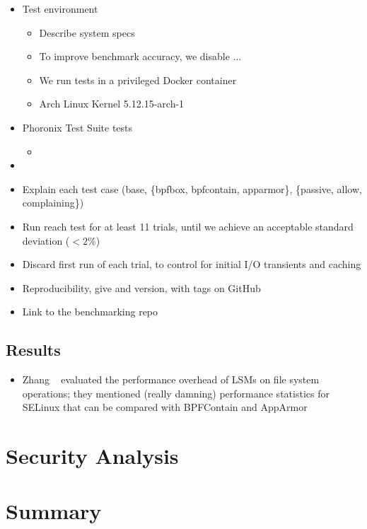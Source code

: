 \begin{inprogress}
  \begin{itemize}
    \item Test environment
    \begin{itemize}
      \item Describe system specs
      \item To improve benchmark accuracy, we disable ...
      \item We run tests in a privileged Docker container
      \item Arch Linux Kernel 5.12.15-arch-1
    \end{itemize}

    \item Phoronix Test Suite tests
    \begin{itemize}
      \item {}
    \end{itemize}

    \item {}

    \item Explain each test case (base, \{bpfbox, bpfcontain, apparmor\}, \{passive, allow, complaining\})
    \item Run reach test for at least 11 trials, until we achieve an acceptable standard deviation ($<2\%$)
    \item Discard first run of each trial, to control for initial I/O transients and caching
    \item Reproducibility, give \bpfbox{} and \bpfcontain{} version, with tags on GitHub
    \item Link to the benchmarking repo

  \end{itemize}
\end{inprogress}

\subsection{Results}%
\label{ss:eval-results}


\begin{inprogress}
  \begin{itemize}
    \item Zhang \etal~\cite{zhang2021_lsm_file_overhead} evaluated the performance
    overhead of LSMs on file system operations; they mentioned (really damning) performance
    statistics for SELinux that can be compared with BPFContain and AppArmor
  \end{itemize}
\end{inprogress}

\section{Security Analysis}%
\label{s:eval-security}



\section{Summary}%
\label{s:eval-summary}
